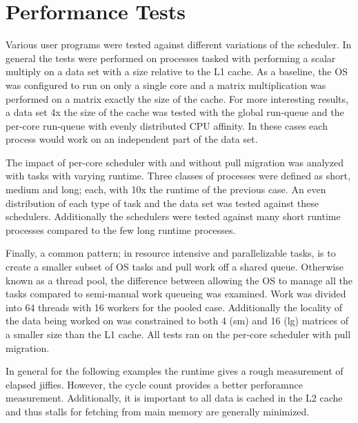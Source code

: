 \documentclass{cys}
\begin{document}
\section{Performance Tests}
\label{sec:perfTests}
Various user programs were tested against different variations of the scheduler.  In general the tests were performed on processes tasked with performing a scalar multiply on a data set with a size relative to the L1 cache.  As a baseline, the OS was configured to run on only a single core and a matrix multiplication was performed on a matrix exactly the size of the cache.  For more interesting results, a data set 4x the size of the cache was tested with the global run-queue and the per-core run-queue with evenly distributed CPU affinity.  In these cases each process would work on an independent part of the data set.  

The impact of per-core scheduler with and without pull migration was analyzed with tasks with varying runtime.  Three classes of processes were defined as short, medium and long; each, with 10x the runtime of the previous case.  An even distribution of each type of task and the data set was tested against these schedulers.  Additionally the schedulers were tested against many short runtime processes compared to the few long runtime processes.

Finally, a common pattern; in resource intensive and parallelizable tasks, is to create a smaller subset of OS tasks and pull work off a shared queue.  Otherwise known as a thread pool, the difference between allowing the OS to manage all the tasks compared to semi-manual work queueing was examined.  Work was divided into 64 threads with 16 workers for the pooled case.  Additionally the locality of the data being worked on was constrained to both 4 (sm) and 16 (lg) matrices of a smaller size than the L1 cache.  All tests ran on the per-core scheduler with pull migration.  


In general for the following examples the runtime gives a rough measurement of elapsed jiffies.  However, the cycle count provides a better perforamnce measurement.  Additionally, it is important to all data is cached in the L2 cache and thus stalls for fetching from main memory are generally minimized.
\end{document}

